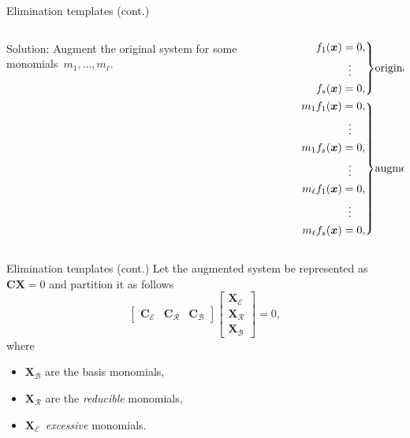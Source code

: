 \documentclass[aspectratio=169]{beamer}
\newcommand{\mat}[1]{\bm{#1}}
\newcommand{\CE}{\ensuremath{\mat{C}_\mathcal{E}}}
\newcommand{\CR}{\ensuremath{\mat{C}_\mathcal{R}}}
\newcommand{\CB}{\ensuremath{\mat{C}_\mathcal{B}}}
\newcommand{\XE}{\ensuremath{\mat{X}_\mathcal{E}}}
\newcommand{\XR}{\ensuremath{\mat{X}_\mathcal{R}}}
\newcommand{\XB}{\ensuremath{\mat{X}_\mathcal{B}}}
\begin{document}
\begin{frame}{Elimination templates (cont.)}
\begin{columns}
    \begin{column}{0.5\textwidth}
\alert{Solution:}
Augment the original system
for some monomials~$m_1,\ldots, m_\ell$.
    \end{column}%
    \begin{column}{0.5\textwidth}
\footnotesize
\begin{equation*}\label{kappa:eq:polsys-aug}
    \begin{aligned}
    \left.
    \begin{aligned}
    f_1(\mat{x}) & = 0, \\
                 & \hspace{0.575em} \vdots \\
    f_s(\mat{x}) & = 0, \\
    \end{aligned}
    \right\}&\text{original}
    \\
    \left.
    \begin{aligned}
    m_1f_1(\mat{x}) & = 0, \\
                 & \hspace{0.575em} \vdots \\
    m_1f_s(\mat{x}) & = 0, \\
                 & \hspace{0.575em} \vdots \\
    m_\ell f_1(\mat{x}) & = 0, \\
                 & \hspace{0.575em} \vdots \\
    m_\ell f_s(\mat{x}) & = 0,
    \end{aligned}
    \right\}&\text{augmented}
    \end{aligned}
\end{equation*}
    \end{column}
\end{columns}
\end{frame}

\begin{frame}{Elimination templates (cont.)}
Let the augmented system be represented as~$\mat{CX}=0$ and partition it as follows
\begin{equation*}
    \begin{bmatrix}
        \CE &
        \CR &
        \CB
    \end{bmatrix}
    \begin{bmatrix}
        \XE \\
        \XR \\
        \XB
    \end{bmatrix}
    = 0,
\end{equation*}
where
\begin{itemize}
\item $\XB$ are the basis monomials,
\item $\XR$ are the \emph{reducible} monomials,
\item $\XE$~\emph{excessive} monomials.
\end{itemize}
\end{frame}
\end{document}
